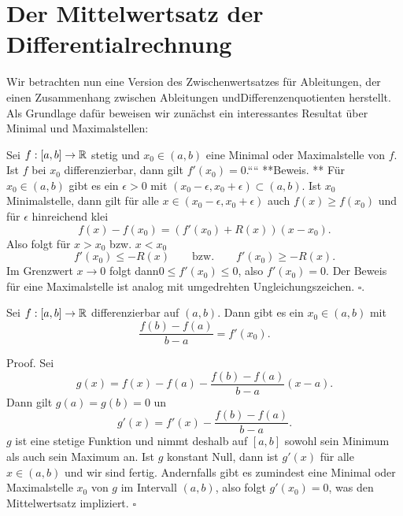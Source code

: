 \section{Der Mittelwertsatz der Differentialrechnung}
\label{\detokenize{differential/mws:der-mittelwertsatz-der-differentialrechnung}}\label{\detokenize{differential/mws::doc}}
Wir betrachten nun eine Version des Zwischenwertsatzes für Ableitungen, der einen Zusammenhang zwischen Ableitungen undDifferenzenquotienten herstellt. Als Grundlage dafür beweisen wir zunächst ein interessantes Resultat über Minimal  und Maximalstellen:
\label{differential/mws:lemma-0}
\begin{emphBox}{}{}{}



Sei \(f:[a,b] \rightarrow \mathbb{R}\) stetig und \(x_0 \in (a,b)\) eine Minimal  oder Maximalstelle von \(f\). Ist \(f\) bei \(x_0\) differenzierbar, dann gilt \(f'(x_0) = 0\).````
**Beweis. ** Für \(x_0 \in (a,b)\) gibt es ein \(\epsilon > 0\) mit \((x_0 - \epsilon, x_0 + \epsilon) \subset (a,b)\). Ist \(x_0\) Minimalstelle, dann gilt für alle \(x \in (x_0 - \epsilon, x_0 + \epsilon)\) auch \(f(x) \geq f(x_0)\) und für \(\epsilon\) hinreichend klei
\begin{equation*}
 f(x) - f(x_0) = (f'(x_0) + R(x))(x-x_0).
\end{equation*}
Also folgt für \(x > x_0\) bzw. \(x < x_0\)
\begin{equation*}
 f'(x_0) \leq -  R(x) \qquad \text{bzw.} \qquad f'(x_0) \geq  - R(x).
\end{equation*}
Im Grenzwert \(x \rightarrow 0\) folgt dann\( 0 \leq f'(x_0) \leq 0\), also \(f'(x_0) = 0\). Der Beweis für eine Maximalstelle ist analog mit umgedrehten Ungleichungszeichen. \(\square\).
\label{differential/mws:theorem-1}
\begin{lemma}{}{}



Sei \(f:[a,b] \rightarrow \mathbb{R}\) differenzierbar auf \((a,b)\). Dann gibt es ein \(x_0 \in (a,b)\) mit
\begin{equation*}
 \frac{f(b) - f(a)}{b-a} = f'(x_0) .
\end{equation*}\end{lemma}
\end{emphBox}

\begin{emphBox}{}{}
Proof. Sei
\begin{equation*}
 g(x) = f(x) - f(a) - \frac{f(b) - f(a)}{b-a}(x-a).
\end{equation*}
Dann gilt \(g(a) = g(b) = 0\) un
\begin{equation*}
 g'(x) = f'(x) -  \frac{f(b) - f(a)}{b-a}.
\end{equation*}
\(g\) ist eine stetige Funktion und nimmt deshalb auf \([a,b]\) sowohl sein Minimum als auch sein Maximum an. Ist \(g\) konstant Null, dann ist \(g'(x)\) für alle \(x \in (a,b)\) und wir sind fertig. Andernfalls gibt es zumindest eine Minimal  oder Maximalstelle \(x_0\) von \(g\) im Intervall \((a,b)\), also folgt \(g'(x_0)=0\), was den Mittelwertsatz impliziert. \(\square\)
\end{emphBox}

